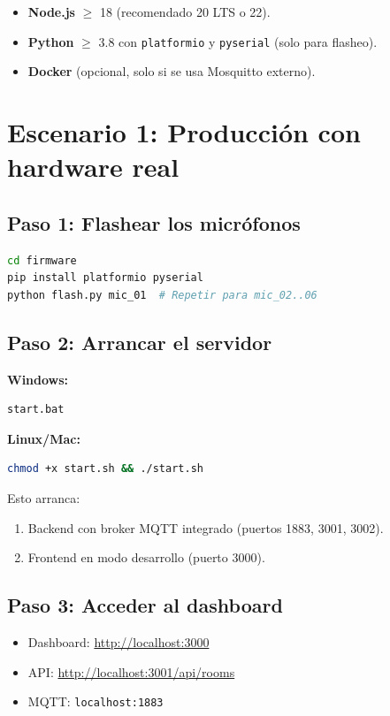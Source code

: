 \documentclass[12pt,a4paper]{report}
\begin{document}
\begin{itemize}
    \item \textbf{Node.js} $\geq$ 18 (recomendado 20 LTS o 22).
    \item \textbf{Python} $\geq$ 3.8 con \texttt{platformio} y \texttt{pyserial} (solo para flasheo).
    \item \textbf{Docker} (opcional, solo si se usa Mosquitto externo).
\end{itemize}

\section{Escenario 1: Producci\'on con hardware real}

\subsection{Paso 1: Flashear los micr\'ofonos}

\begin{lstlisting}[language=bash]
cd firmware
pip install platformio pyserial
python flash.py mic_01  # Repetir para mic_02..06
\end{lstlisting}

\subsection{Paso 2: Arrancar el servidor}

\textbf{Windows:}
\begin{lstlisting}[language=bash]
start.bat
\end{lstlisting}

\textbf{Linux/Mac:}
\begin{lstlisting}[language=bash]
chmod +x start.sh && ./start.sh
\end{lstlisting}

Esto arranca:
\begin{enumerate}
    \item Backend con broker MQTT integrado (puertos 1883, 3001, 3002).
    \item Frontend en modo desarrollo (puerto 3000).
\end{enumerate}

\subsection{Paso 3: Acceder al dashboard}

\begin{itemize}
    \item Dashboard: \url{http://localhost:3000}
    \item API: \url{http://localhost:3001/api/rooms}
    \item MQTT: \texttt{localhost:1883}
\end{itemize}
\end{document}
